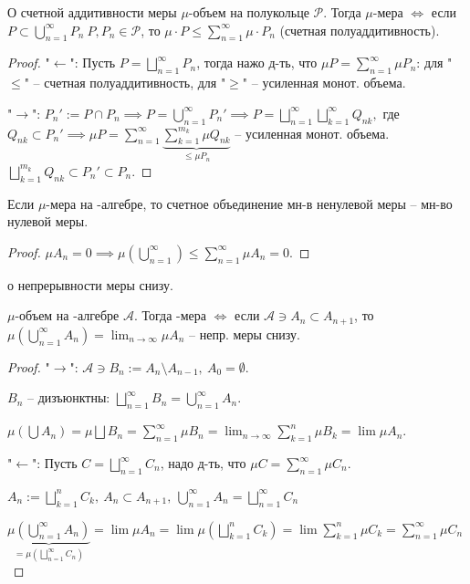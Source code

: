 \begin{theorem}
    О счетной аддитивности меры $\mu$-объем на полукольце $\mathcal{P}$. Тогда $\mu$-мера $\Leftrightarrow$ если $P \subset \bigcup_{n=1}^{\infty}P_n \ P, P_n \in \mathcal{P}$, то $\mu \cdot P \leq \sum_{n=1}^{\infty}\mu \cdot P_n$ (счетная полуаддитивность). 
\end{theorem}
\begin{proof}
    "$\leftarrow$": Пусть $P=\bigsqcup_{n=1}^{\infty} P_n$, тогда нажо д-ть, что $\mu P = \sum_{n=1}^{\infty} \mu P_n$: для "$\leq$" -- счетная полуаддитивность, для "$\geq$" -- усиленная монот. объема.

    "$\rightarrow$": $P_n' := P \cap P_n \implies P = \bigcup_{n=1}^{\infty}P_n' \implies P = \bigsqcup_{n=1}^{\infty} \bigsqcup_{k=1}^{\infty} Q_{nk}, $ где $Q_{nk} \subset P_n' \implies \mu P = \sum_{n=1}^{\infty} \underbrace{\sum_{k=1}^{m_k} \mu Q_{nk}}_{\leq \mu P_n}$ -- усиленная монот. объема. $\bigsqcup_{k=1}^{m_k} Q_{nk} \subset P_n' \subset P_n$.
\end{proof}

\begin{consequence}
    Если $\mu$-мера на \sigma-алгебре, то счетное объединение мн-в ненулевой меры -- мн-во нулевой меры.
\end{consequence}
\begin{proof}
    $\mu A_n = 0 \implies \mu \left( \bigcup_{n=1}^{\infty} \right) \leq \sum_{n=1}^{\infty} \mu A_n = 0$.
\end{proof}

\begin{theorem}
    о непрерывности меры снизу.

    $\mu$-объем на \sigma-алгебре $\mathcal{A}$. Тогда \mu-мера $\Leftrightarrow$ если $\mathcal{A} \ni A_n \subset A_{n+1}$, то $\mu \left( \bigcup_{n=1}^{\infty} A_n \right) = \lim_{n \rightarrow \infty }{\mu A_n}$ -- непр. меры снизу. 
\end{theorem}
\begin{proof}
    "$\rightarrow$": $\mathcal{A} \ni B_n := A_n \setminus A_{n-1}, \ A_0 = \emptyset$.

    $B_n$ -- дизъюнктны: $\bigsqcup_{n=1}^{\infty} B_n = \bigcup_{n=1}^{\infty} A_n$.

    $\mu \left( \bigcup A_n \right) = \mu \bigsqcup B_n = \sum_{n=1}^{\infty}\mu B_n = \lim_{n \rightarrow \infty} \sum_{k=1}^{n} \mu B_k = \lim \mu A_n$.

    "$\leftarrow$": Пусть $C = \bigsqcup_{n=1}^{\infty} C_n$, надо д-ть, что $\mu C = \sum_{n=1}^{\infty} \mu C_n$.

    $A_n := \bigsqcup_{k=1}^{n} C_k, \ A_n \subset A_{n+1}, \ \bigcup_{n=1}^{\infty} A_n = \bigsqcup_{n=1}^{\infty} C_n$

    $\underbrace{\mu \left( \bigcup_{n=1}^{\infty} A_n\right)}_{= \mu \left( \bigsqcup_{n=1}^{\infty} C_n\right)} = \lim \mu A_n = \lim \mu \left( \bigsqcup_{k=1}^{n} C_k\right)  = \lim \sum_{k=1}^{n} \mu C_k = \sum_{n=1}^{\infty} \mu C_n$
\end{proof}

